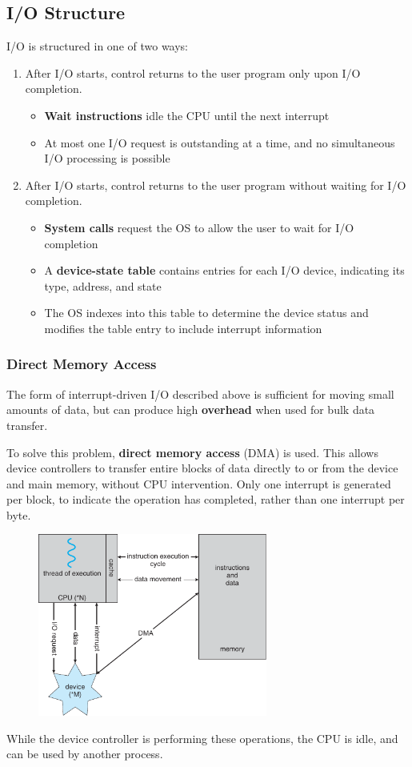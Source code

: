 \documentclass{article}
\begin{document}
\subsection{I/O Structure}
I/O is structured in one of two ways:
\begin{enumerate}
    \item After I/O starts, control returns to the user program only upon I/O completion.
          \begin{itemize}
              \item \textbf{Wait instructions} idle the CPU until the next interrupt
              \item At most one I/O request is outstanding at a time, and no simultaneous I/O processing is possible
          \end{itemize}
    \item After I/O starts, control returns to the user program without waiting for I/O completion.
          \begin{itemize}
              \item \textbf{System calls} request the OS to allow the user to wait for I/O completion
              \item A \textbf{device-state table} contains entries for each I/O device, indicating its type, address, and state
              \item The OS indexes into this table to determine the device status and modifies the table entry to include interrupt information
          \end{itemize}
\end{enumerate}
\subsubsection{Direct Memory Access}
The form of interrupt-driven I/O described above is sufficient for
moving small amounts of data, but can produce high \textbf{overhead} when used for bulk data transfer.

To solve this problem, \textbf{direct memory access} (DMA) is used. This allows device controllers to transfer
entire blocks of data directly to or from the device and main memory, without CPU intervention.
Only one interrupt is generated per block, to indicate the operation has completed, rather than one interrupt per byte.
\begin{figure}[H]
    \centering
    \includegraphics[height = 6cm]{figures/dma.pdf}
\end{figure}
While the device controller is performing these operations, the CPU is idle, and can be used by another process.
\end{document}

